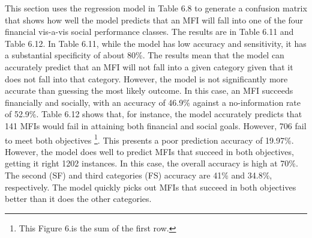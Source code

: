 \documentclass[a4paper, nobind]{templates/ociamthesis}
\begin{document}
This section uses the regression model in Table 6.8 to generate a confusion matrix that shows how well the model predicts that an MFI will fall into one of the four financial vis-a-vis social performance classes. The results are in Table 6.11 and Table 6.12. In Table 6.11, while the model has low accuracy and sensitivity, it has a substantial specificity of about 80\%. The results mean that the model can accurately predict that an MFI will not fall into a given category given that it does not fall into that category. However, the model is not significantly more accurate than guessing the most likely outcome. In this case, an MFI succeeds financially and socially, with an accuracy of 46.9\% against a no-information rate of 52.9\%. Table 6.12 shows that, for instance, the model accurately predicts that 141 MFIs would fail in attaining both financial and social goals. However, 706 fail to meet both objectives \footnote{This Figure 6.is the sum of the first row.}. This presents a poor prediction accuracy of 19.97\%. However, the model does well to predict MFIs that succeed in both objectives, getting it right 1202 instances. In this case, the overall accuracy is high at 70\%. The second (SF) and third categories (FS) accuracy are 41\% and 34.8\%, respectively. The model quickly picks out MFIs that succeed in both objectives better than it does the other categories.
\end{document}
